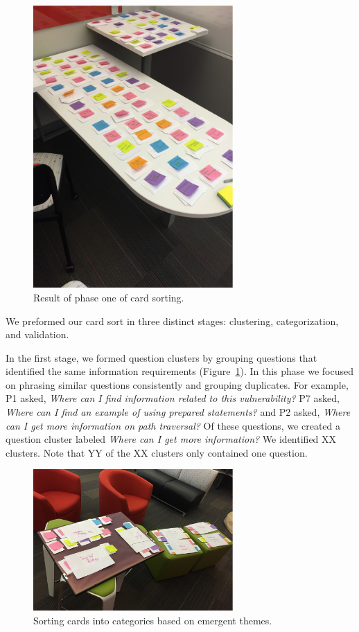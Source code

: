 \documentclass[conference]{IEEEtran}
\begin{document}
\begin{figure}
\centering
\includegraphics[width=3in]{Images/notecards.pdf}
\caption{Result of phase one of card sorting.}
\label{fig:stageOne} 
\end{figure}

We preformed our card sort in three distinct stages: clustering, categorization, and validation.
 
In the first stage, we formed question clusters by grouping questions that identified the same information requirements (Figure~\ref{fig:stageOne}). 
In this phase we focused on phrasing similar questions consistently and grouping duplicates.
For example, P1 asked, \textit{Where can I find information related to this vulnerability?} P7 asked, \textit{Where can I find an example of using prepared statements?} and P2 asked, \textit{Where can I get more information on path traversal?} 
Of these questions, we created a question cluster labeled \textit{Where can I get more information?}
We identified XX clusters. Note that YY of the XX clusters only contained one question.

\begin{figure}
\centering
\includegraphics[width=3in]{Images/categories.pdf}
\caption{Sorting cards into categories based on emergent themes.}
\label{fig:cardsort} 
\end{figure}
\end{document}
